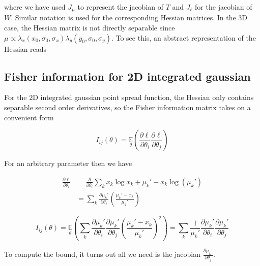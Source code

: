 where we have used $J_{\mu}$ to represent the jacobian of $T$ and $J_{\ell}$ for the jacobian of $W$. Similar notation is used for the corresponding Hessian matrices. 
In the 3D case, the Hessian matrix is not directly separable since $\mu \propto \lambda_{x}(x_{0},\sigma_{0},\sigma_{x})\lambda_{y}(y_{0},\sigma_{0},\sigma_{y})$. To see this, an abstract representation of the Hessian reads 


\subsection{Fisher information for 2D integrated gaussian}

For the 2D integrated gaussian point spread function, the Hessian only contains separable second order derivatives, so the Fisher information matrix takes on a convenient form

\begin{equation}
I_{ij}(\theta) = \underset{\theta}{\mathbb{E}}\left(\frac{\partial \ell}{\partial\theta_{i}}\frac{\partial\ell}{\partial\theta_{j}}\right) 
\end{equation}

For an arbitrary parameter then we have

\begin{align*}
\frac{\partial \ell}{\partial \theta_{i}} &= \frac{\partial}{\partial \theta_{i}} \sum_{k}  x_{k}\log x_{k} + \mu_{k}' - x_{k}\log\left(\mu_{k}'\right)\\
&= \sum_{k} \frac{\partial \mu_{k}'}{\partial\theta_{i}} \left(\frac{\mu_{k}'-x_{k}}{\mu_{k}'}\right)
\end{align*}

\begin{equation*}
I_{ij}(\theta) = \underset{\theta}{\mathbb{E}}\left(\sum_{k}\frac{\partial \mu_{k}'}{\partial\theta_{i}}\frac{\partial \mu_{k}'}{\partial\theta_{j}} \left(\frac{\mu_{k}'-x_{k}}{\mu_{k}'}\right)^{2}\right) = \sum_{k}\frac{1}{\mu_{k}'}\frac{\partial \mu_{k}'}{\partial\theta_{i}}\frac{\partial \mu_{k}'}{\partial\theta_{j}}
\end{equation*}

To compute the bound, it turns out all we need is the jacobian $\frac{\partial \mu_{k}'}{\partial\theta_{j}} $.


